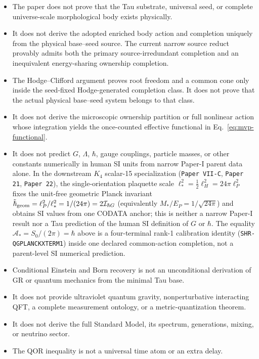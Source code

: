 \documentclass[11pt]{article}
\begin{document}
\begin{itemize}[leftmargin=*,itemsep=1pt,topsep=3pt]
  \item The paper does not prove that the Tau substrate, universal seed, or
  complete universe-scale morphological body exists physically.
  \item It does not derive the adopted enriched body action and completion
  uniquely from the physical base--seed source. The current narrow source
  reduct provably admits both the primary source-irredundant completion and an
  inequivalent energy-sharing ownership completion.
  \item The Hodge--Clifford argument proves root freedom and a common cone only
  inside the seed-fixed Hodge-generated completion class.  It does not prove
  that the actual physical base--seed system belongs to that class.
  \item It does not derive the microscopic ownership partition or full
  nonlinear action whose integration yields the once-counted effective
  functional in Eq.~\eqref{eq:mvp-functional}.
  \item It does not predict \(G\), \(\Lambda\), \(\hbar\), gauge couplings,
  particle masses, or other constants numerically in human SI units from narrow
  Paper-I parent data alone.  In the downstream $K_4$ scalar-15 specialization
  (\texttt{Paper VII-C}, \texttt{Paper 21}, \texttt{Paper 22}), the single-orientation
  plaquette scale $\ell_*^2 = \frac{1}{2}\ell_H^2 = 24\pi\ell_P^2$ fixes the
  unit-free geometric Planck invariant $\tilde\hbar_{\rm geom}=\ell_P^2/\ell_*^2=1/(24\pi)=2\mathcal I_{\hbar G}$
  (equivalently $M_*/E_P=1/\sqrt{24\pi}$) and obtains SI values from one
  CODATA anchor; this is neither a narrow Paper-I result nor a Tau prediction
  of the human SI definition of $G$ or $\hbar$.
  The equality $\mathcal A_*=S_0/(2\pi)=\hbar$ above is a four-terminal
  rank-1 calibration identity (\texttt{SHR-QGPLANCKXTERM1}) inside one declared
  common-action completion, not a parent-level SI numerical prediction.
  \item Conditional Einstein and Born recovery is not an unconditional
  derivation of GR or quantum mechanics from the minimal Tau base.
  \item It does not provide ultraviolet quantum gravity, nonperturbative
  interacting QFT, a complete measurement ontology, or a metric-quantization
  theorem.
  \item It does not derive the full Standard Model, its spectrum, generations,
  mixing, or neutrino sector.
  \item The QOR inequality is not a universal time atom or an extra delay.

\end{itemize}
\end{document}
